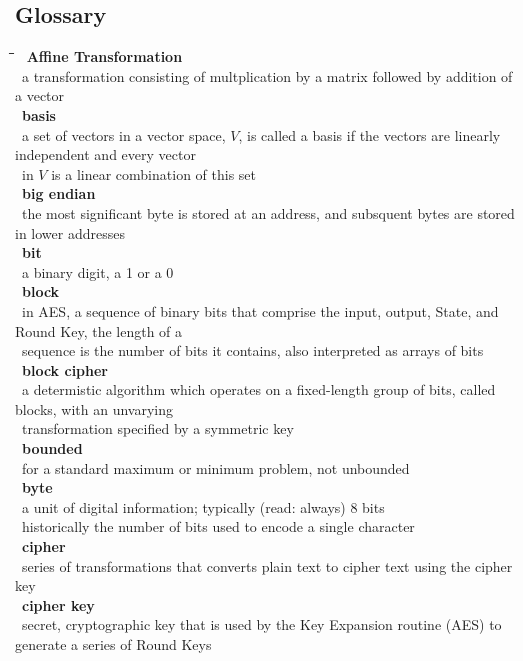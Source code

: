 \documentclass[10pt,letterpaper]{scrartcl}
\newcommand{\tbul}{\textbullet}
\newcommand{\tend}{\>\textendash}
\newcommand{\tabDef}{\hspace{2em}\=\hspace{2em}\=\hspace{2em}\=\hspace{2em}\=\kill}
\begin{document}
\begin{tabbing}
\newpage\section{Glossary}\begin{tabbing}\tabDef 
\tbul\ \textbf{Affine Transformation} \\
    \tend\ a transformation consisting of multplication by a matrix followed by addition of a vector \\
\tbul\ \textbf{basis} \\
    \tend\ a set of vectors in a vector space, $V$, is called a basis if the vectors are linearly independent and every vector \\ \>\ in $V$ is a linear combination of this set \\
\tbul\ \textbf{big endian} \\
    \tend\ the most significant byte is stored at an address, and subsquent bytes are stored in lower addresses\\
\tbul\ \textbf{bit} \\
    \tend\ a binary digit, a 1 or a 0 \\
\tbul\ \textbf{block} \\
    \tend\ in AES, a sequence of binary bits that comprise the input, output, State, and Round Key, the length of a \\ \>\ sequence is the number of bits it contains, also interpreted as arrays of bits \\
\tbul\ \textbf{block cipher} \\
    \tend\ a determistic algorithm which operates on a fixed-length group of bits, called blocks, with an unvarying \\ \>\ transformation specified by a symmetric key \\
\tbul\ \textbf{bounded} \\
    \tend\ for a standard maximum or minimum problem, not unbounded \\
\tbul\ \textbf{byte} \\
    \tend\ a unit of digital information; typically (read: always) 8 bits \\
    \tend\ historically the number of bits used to encode a single character \\
\tbul\ \textbf{cipher} \\
    \tend\ series of transformations that converts plain text to cipher text using the cipher key \\
\tbul\ \textbf{cipher key} \\ 
    \tend\ secret, cryptographic key that is used by the Key Expansion routine (AES) to generate a series of Round Keys \\

\end{tabbing}
\end{tabbing}
\end{document}

